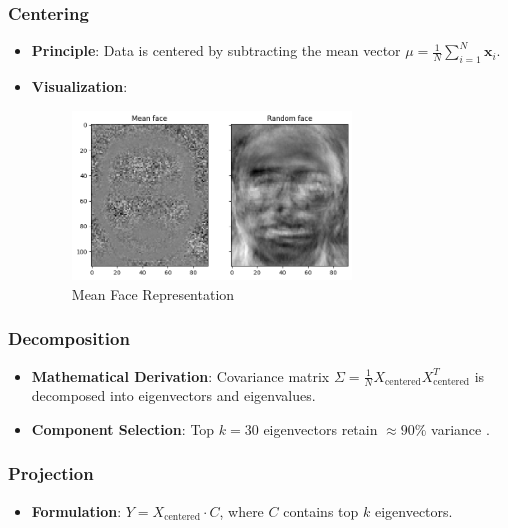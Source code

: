 \documentclass{article}
\begin{document}
	\subsubsection{Centering}
	\begin{itemize}
		\item \textbf{Principle}: Data is centered by subtracting the mean vector \(\mu = \frac{1}{N} \sum_{i=1}^{N} \mathbf{x}_i\).
		\item \textbf{Visualization}:
		\begin{figure}[h]
			\centering
			\includegraphics[width=0.7\textwidth]{mean_face.png}
			\caption{Mean Face Representation}
			\label{fig:mean_face}
		\end{figure}
	\end{itemize}
	
	\subsubsection{Decomposition}
	\begin{itemize}
		\item \textbf{Mathematical Derivation}: Covariance matrix \(\Sigma = \frac{1}{N} X_{\text{centered}} X_{\text{centered}}^T\) is decomposed into eigenvectors and eigenvalues.
		\item \textbf{Component Selection}: Top \(k=30\) eigenvectors retain \(\approx 90\%\) variance \citep{jolliffe2002principal}.
	\end{itemize}
	
	\subsubsection{Projection}
	\begin{itemize}
		\item \textbf{Formulation}: \(Y = X_{\text{centered}} \cdot C\), where \(C\) contains top \(k\) eigenvectors.
	\end{itemize}
	
\end{document}
